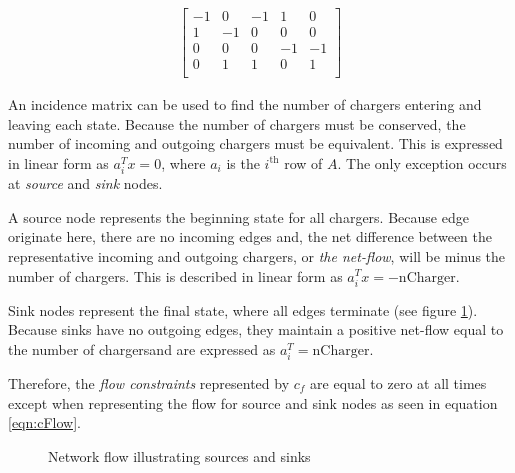\begin{align}
	\begin{bmatrix}
		-1 & 0 & -1 & 1 & 0 \\
		1 & -1 & 0 & 0 & 0 \\
		0 & 0 & 0 & -1 & -1 \\
		0 & 1 & 1 & 0 & 1 \\
	\end{bmatrix}
\end{align}
\par  An incidence matrix can be used to find the number of chargers entering and leaving each state. Because the number of chargers must be conserved, the number of incoming and outgoing chargers must be equivalent. This is expressed in linear form as $a_i^{T}x = 0$, where $a_i$ is the $i^{\text{th}}$ row of $A$. The only exception occurs at \textit{source} and \textit{sink} nodes.
\par A source node represents the beginning state for all chargers.  Because edge originate here, there are no incoming edges and, the net difference between the representative incoming and outgoing chargers, or \textit{the net-flow}, will be minus the number of chargers. This is described in linear form as $a_i^Tx = -\text{nCharger}$.
\par Sink nodes represent the final state, where all edges terminate (see figure \ref{fig:sourceSink}). Because sinks have no outgoing edges, they maintain a positive net-flow equal to the number of chargersand are expressed as $a_i^T = \text{nCharger}$. 
\par Therefore, the \textit{flow constraints} represented by $c_f$ are equal to zero at all times except when representing the flow for source and sink nodes as seen in equation \ref{eqn:cFlow}.  
\begin{figure}
	\centering
{}
	\caption{Network flow illustrating sources and sinks}
	\label{fig:sourceSink} 
\end{figure} 
